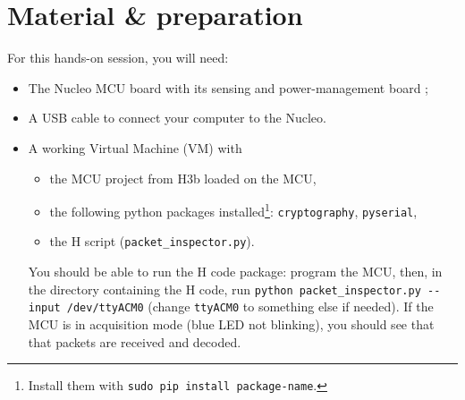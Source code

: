 \section*{Material \& preparation}

\begin{comment}[couleur = gray!20, arrondi = 0.2, logo=\bcinfo]{}
\vspace{0.2cm}
\end{comment}
For this hands-on session, you will need:
\begin{itemize}
    \item The Nucleo MCU board with its sensing and power-management board ;
    \item A USB cable to connect your computer to the Nucleo.
    \item A working Virtual Machine (VM) with
        \begin{itemize}
            \item the MCU project from H3b loaded on the MCU,
            \item the following python packages installed\footnote{%
                    Install them with \texttt{sudo pip install package-name}.
                }:
                \texttt{cryptography}, \texttt{pyserial},
            \item the H\handsOnN{} script (\texttt{packet\_inspector.py}).
        \end{itemize}
        You should be able to run the H\handsOnN{} code package:
        program the MCU, then, in the directory containing the
        H\handsOnN{} code, run \texttt{python packet\_inspector.py -{}-input
        /dev/ttyACM0} (change \texttt{ttyACM0} to something else if needed).
        If the MCU is in acquisition mode (blue LED not blinking), you should
        see that that packets are received and decoded.
\end{itemize}
